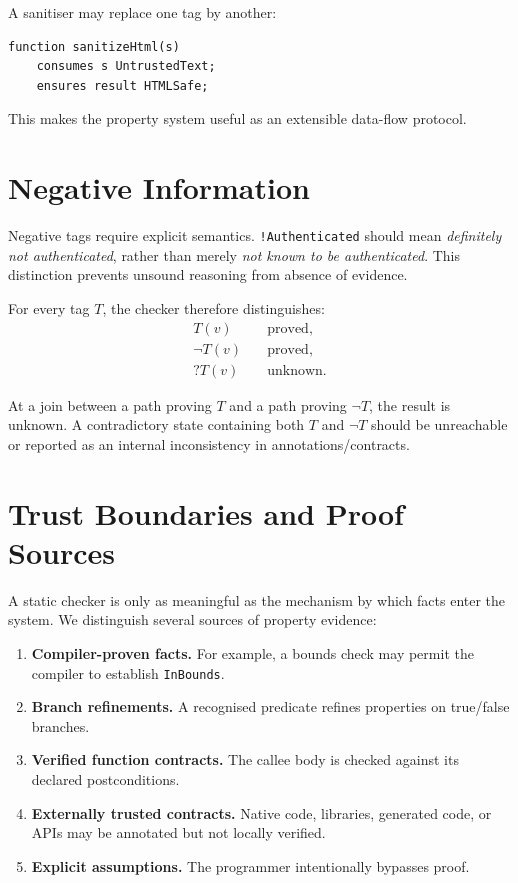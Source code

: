 \documentclass[11pt]{article}
\begin{document}
A sanitiser may replace one tag by another:

\begin{lstlisting}
function sanitizeHtml(s)
    consumes s UntrustedText;
    ensures result HTMLSafe;
\end{lstlisting}

This makes the property system useful as an extensible data-flow protocol.

\section{Negative Information}
Negative tags require explicit semantics. \texttt{!Authenticated} should mean \emph{definitely not authenticated}, rather than merely \emph{not known to be authenticated}. This distinction prevents unsound reasoning from absence of evidence.

For every tag $T$, the checker therefore distinguishes:
\begin{align*}
T(v) &\quad \text{proved},\\
\neg T(v) &\quad \text{proved},\\
?T(v) &\quad \text{unknown}.
\end{align*}

At a join between a path proving $T$ and a path proving $\neg T$, the result is unknown. A contradictory state containing both $T$ and $\neg T$ should be unreachable or reported as an internal inconsistency in annotations/contracts.

\section{Trust Boundaries and Proof Sources}
A static checker is only as meaningful as the mechanism by which facts enter the system. We distinguish several sources of property evidence:

\begin{enumerate}
  \item \textbf{Compiler-proven facts.} For example, a bounds check may permit the compiler to establish \texttt{InBounds}.
  \item \textbf{Branch refinements.} A recognised predicate refines properties on true/false branches.
  \item \textbf{Verified function contracts.} The callee body is checked against its declared postconditions.
  \item \textbf{Externally trusted contracts.} Native code, libraries, generated code, or APIs may be annotated but not locally verified.
  \item \textbf{Explicit assumptions.} The programmer intentionally bypasses proof.
\end{enumerate}
\end{document}
